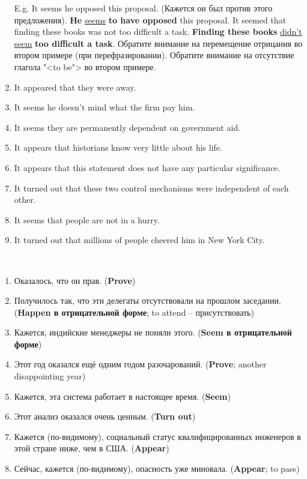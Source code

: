 \documentclass[main.tex]{subfiles}
\begin{document}

\begin{enumerate}[nosep,leftmargin=*]
	\itemsep\eitsp
	\item[E.g.] It seems he opposed this proposal. (Кажется он был против этого предложения).\newline
		\textbf{He} \uline{seems} \textbf{to have opposed} this proposal.
		\newline
		It seemed that finding these books was not too difficult a task.
		\newline
		\textbf{Finding these books} \uline{didn't seem} \textbf{too difficult a task}.
		\newline
		Обратите внимание на перемещение отрицания во втором примере (при перефразировании).
		Обратите внимание на отсутствие глагола "<to be"> во втором примере.
	\item It appeared that they were away.
	\item It seems he doesn't mind what the firm pay him.
	\item It seems they are permanently dependent on government aid.
	\item It appears that historians know very little about his life.
	\item It appears that this statement does not have any particular significance.
	\item It turned out that these two control mechanisms were independent of each other.
	\item It seems that people are not in a hurry.
	\item It turned out that millions of people cheered him in New York City.
\end{enumerate}
\ 


\begin{enumerate}[nosep,leftmargin=*]
	\itemsep\eitsp
	\item Оказалось, что он прав. (\textbf{Prove})
	\item Получилось так, что эти делегаты отсутствовали на прошлом заседании. (\textbf{Happen в отрицательной форме}; to attend -- присутствовать)
	\item Кажется, индийские менеджеры не поняли этого. (\textbf{Seem в отрицательной форме})
	\item Этот год оказался ещё одним годом разочарований. (\textbf{Prove}; another disappointing year)
	\item Кажется, эта система работает в настоящее время. (\textbf{Seem})
	\item Этот анализ оказался очень ценным. (\textbf{Turn out})
	\item Кажется (по-видимому), социальный статус квалифицированных инженеров в этой стране ниже, чем в США. (\textbf{Appear})
	\item Сейчас, кажется (по-видимому), опасность уже миновала. (\textbf{Appear}; to pass)
\end{enumerate}
\ 
\end{document}
